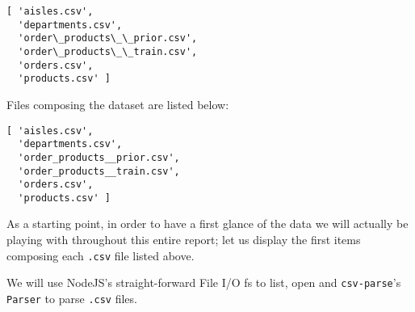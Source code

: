 \documentclass[11pt]{article}
\begin{document}
    \begin{Verbatim}[commandchars=\\\{\}]
[ 'aisles.csv',
  'departments.csv',
  'order\_products\_\_prior.csv',
  'order\_products\_\_train.csv',
  'orders.csv',
  'products.csv' ]

    \end{Verbatim}

    Files composing the dataset are listed below:

\begin{verbatim}
[ 'aisles.csv',
  'departments.csv',
  'order_products__prior.csv',
  'order_products__train.csv',
  'orders.csv',
  'products.csv' ]
\end{verbatim}

As a starting point, in order to have a first glance of the data we will
actually be playing with throughout this entire report; let us display
the first items composing each \texttt{.csv} file listed above.

We will use NodeJS's straight-forward File I/O fs to list, open and
\texttt{\textquotesingle{}csv-parse\textquotesingle{}}'s \texttt{Parser}
to parse \texttt{.csv} files.
\end{document}
